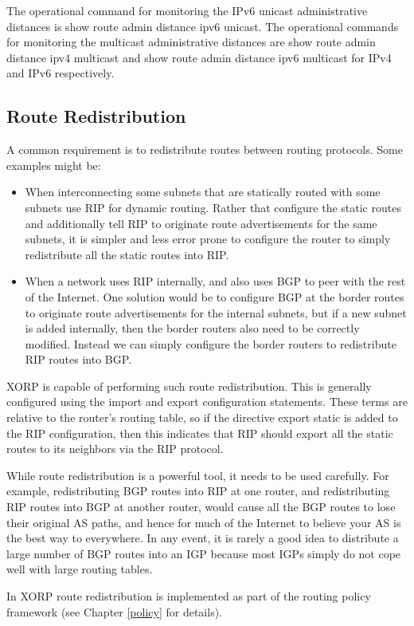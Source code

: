 The operational command for monitoring the IPv6 unicast administrative 
distances is {\stt show route admin distance ipv6 unicast}.
The operational commands for monitoring the multicast administrative 
distances are {\stt show route admin distance ipv4 multicast}
and {\stt show route admin distance ipv6 multicast}
for IPv4 and IPv6 respectively.

\subsection{Route Redistribution}

A common requirement is to redistribute routes between routing
protocols.  Some examples might be:

\begin{itemize}
\item When interconnecting some subnets that are statically routed
  with some subnets use RIP for dynamic routing.  Rather
  that configure the static routes and additionally tell RIP to
  originate route advertisements for the same subnets, it is simpler
  and less error prone to configure the router to simply redistribute
  all the static routes into RIP.
\item When a network uses RIP internally, and also uses BGP to
  peer with the rest of the Internet.  One solution would be to
  configure BGP at the border routes to originate route advertisements
  for the internal subnets, but if a new subnet is added internally,
  then the border routers also need to be correctly modified.  Instead
  we can simply configure the border routers to redistribute RIP
  routes into BGP.  
\end{itemize}

XORP is capable of performing such route redistribution.  This is
generally configured using the {\stt import} and {\stt export}
configuration statements.  These terms are relative to the router's
routing table, so if the directive {\stt export static} is added to the
RIP configuration, then this indicates that RIP should export all the
static routes to its neighbors via the RIP protocol.

While route redistribution is a powerful tool, it needs to be used
carefully.  For example, redistributing BGP routes into RIP at one
router, and redistributing RIP routes into BGP at another router,
would cause all the BGP routes to lose their original AS paths, and
hence for much of the Internet to believe your AS is the best way to
everywhere.  In any event, it is rarely a good idea to distribute a
large number of BGP routes into an IGP because most IGPs simply do not
cope well with large routing tables.

In XORP route redistribution is implemented as part of the routing
policy framework (see Chapter \ref{policy} for details).
